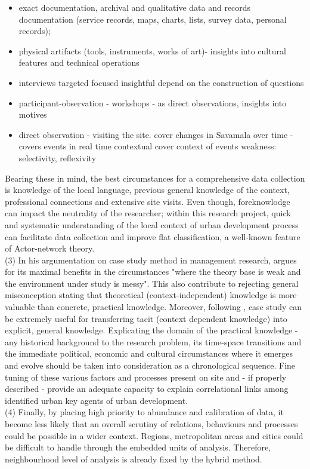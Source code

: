 \documentclass[11pt]{report}
\begin{document}
\begin{itemize}
\item exact documentation, archival and qualitative data and records documentation (service records, maps, charts, lists, survey data, personal records);
\item physical artifacts (tools, instruments, works of art)- insights into cultural features and technical operations
\item interviews targeted focused insightful depend on the construction of questions
\item participant-observation - workshops -  as direct observations, insights into motives
\item direct observation - visiting the site. cover changes in Savamala over time -  covers events in real time contextual cover context of events weakness: selectivity, reflexivity
\end{itemize}
Bearing these in mind, the best circumstances for a comprehensive data collection is knowledge of the local language, previous general knowledge of the context, professional connections and extensive site visits. Even though, foreknowlodge can impact the neutrality of the researcher; within this research project, quick and systematic understanding of the local context of urban development process can facilitate data collection and improve flat classification, a well-known feature of Actor-network theory. 
\\
(3) In his argumentation on case study method in management research,  argues for its maximal benefits in the circumstances "where the theory base is weak and the environment under study is messy". This also contribute to rejecting general misconception stating that theoretical (context-independent) knowledge is more valuable than concrete, practical knowledge. Moreover, following , case study can be extremely useful for transferring tacit (context dependent knowledge) into explicit, general knowledge. Explicating the domain of the practical knowledge -
any historical background to the research problem, its time-space transitions and the immediate political, economic and cultural circumstances where it emerges and evolve should be taken into consideration as a chronological sequence. Fine tuning of these various factors and processes present on site and  - if properly described - provide an adequate capacity to explain correlational links among identified urban key agents of urban development.
\\
(4) Finally, by placing high priority to abundance and calibration of data, it become less likely that an overall scrutiny of relations, behaviours and processes could be possible in a wider context. Regions, metropolitan areas and cities could be difficult to handle through the embedded units of analysis. Therefore, neighbourhood level of analysis is already fixed by the hybrid method.
\end{document}
